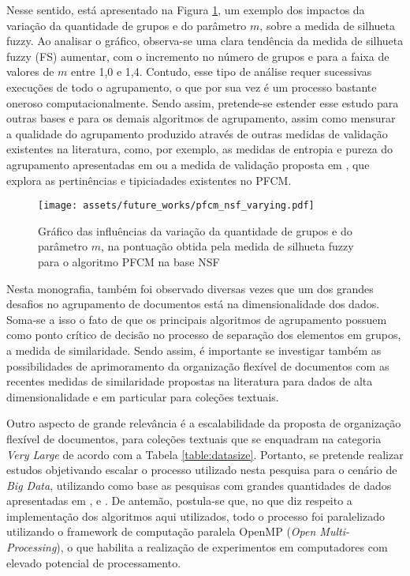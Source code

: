 Nesse sentido, está apresentado na Figura \ref{fig:pfcmvarying}, um exemplo dos impactos da variação
da quantidade de grupos e do parâmetro $m$, sobre a medida de silhueta fuzzy. Ao analisar o gráfico,
observa-se uma clara tendência da medida de silhueta fuzzy (FS) aumentar, com o incremento no número
de grupos e para a faixa de valores de $m$ entre 1,0 e 1,4. Contudo, esse tipo de análise requer
sucessivas execuções de todo o agrupamento, o que por sua vez é um processo bastante oneroso
computacionalmente. Sendo assim, pretende-se estender esse estudo para outras bases e para os
demais algoritmos de agrupamento, assim como mensurar a qualidade do agrupamento produzido
através de outras medidas de validação existentes na literatura, como, por exemplo, as medidas de
entropia e pureza do agrupamento apresentadas em  ou a medida de validação
proposta em , que explora as pertinências e tipiciadades existentes no
PFCM.

\begin{figure}[!h] \centering 
  \centering
  \texttt{[image: assets/future\_works/pfcm\_nsf\_varying.pdf]} 
  \caption{Gráfico das influências da variação da quantidade de grupos e do parâmetro $m$, na
pontuação obtida pela medida de silhueta fuzzy para o algoritmo PFCM na base NSF} 
  \label{fig:pfcmvarying}
\end{figure}

Nesta monografia, também foi observado diversas vezes que um dos grandes desafios no agrupamento de
documentos está na dimensionalidade dos dados. Soma-se a isso o fato de que os principais algoritmos
de agrupamento possuem como ponto crítico de decisão no processo de separação dos elementos em
grupos, a medida de similaridade. Sendo assim, é importante se investigar também as possibilidades de
aprimoramento da organização flexível de documentos com as recentes medidas de similaridade
propostas na literatura \cite{Lin2014,Nagwani2015} para dados de alta dimensionalidade e em
particular para coleções textuais.

Outro aspecto de grande relevância é a escalabilidade da proposta de organização flexível de
documentos, para coleções textuais que se enquadram na categoria {\it Very Large\/} de acordo com a
Tabela \ref{table:datasize}. Portanto, se pretende realizar estudos objetivando escalar o processo
utilizado nesta pesquisa para o cenário de {\it Big Data\/}, utilizando como base as pesquisas com
grandes quantidades de dados apresentadas em ,  e
. De antemão, postula-se que, no que diz respeito a implementação dos
algoritmos aqui utilizados, todo o processo foi paralelizado utilizando o framework de computação
paralela OpenMP ({\it Open Multi-Processing\/})\footnotemark, o que habilita a realização de
experimentos em computadores com elevado potencial de processamento.


